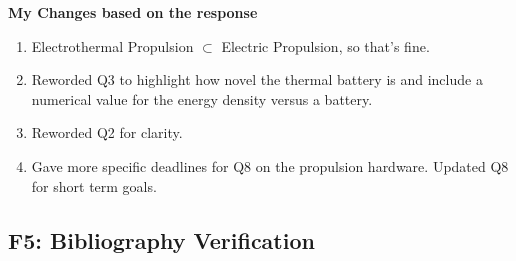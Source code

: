\textbf{My Changes based on the response}
\begin{enumerate}
    \item Electrothermal Propulsion $\subset$ Electric Propulsion, so that's fine.
    \item Reworded Q3 to highlight how novel the thermal battery is and include a numerical value for the energy density versus a battery.
    \item Reworded Q2 for clarity.
    \item Gave more specific deadlines for Q8 on the propulsion hardware. Updated Q8 for short term goals.
\end{enumerate}

\subsection{F5: Bibliography Verification}
